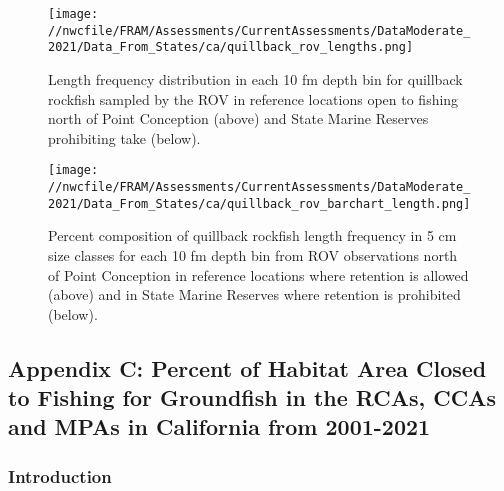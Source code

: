 \documentclass[11pt,
  english,
  letterpaper,
]{article}
\begin{document}

\begin{figure}
\centering
\texttt{[image: //nwcfile/FRAM/Assessments/CurrentAssessments/DataModerate\_2021/Data\_From\_States/ca/quillback\_rov\_lengths.png]}
\caption{Length frequency distribution in each 10 fm depth bin for quillback rockfish sampled by the ROV in reference locations open to fishing north of Point Conception (above) and State Marine Reserves prohibiting take (below).\label{fig:ca-ROV}}
\end{figure}

\tagmcend\tagstructend


\begin{figure}
\centering
\texttt{[image: //nwcfile/FRAM/Assessments/CurrentAssessments/DataModerate\_2021/Data\_From\_States/ca/quillback\_rov\_barchart\_length.png]}
\caption{Percent composition of quillback rockfish length frequency in 5 cm size classes for each 10 fm depth bin from ROV observations north of Point Conception in reference locations where retention is allowed (above) and in State Marine Reserves where retention is prohibited (below).\label{fig:ca-ROV-percent}}
\end{figure}

\tagmcend\tagstructend

\clearpage


\hypertarget{append_c}{%
\subsection{Appendix C: Percent of Habitat Area Closed to Fishing for Groundfish in the RCAs, CCAs and MPAs in California from 2001-2021}\label{append_c}}

\leavevmode\tagmcend\tagstructend


\hypertarget{introduction-1}{%
\subsubsection{Introduction}\label{introduction-1}}
\end{document}
